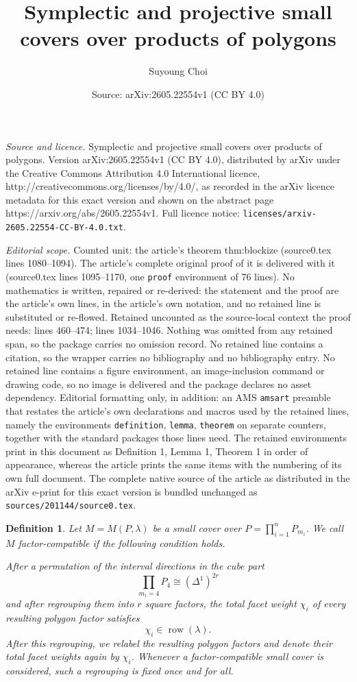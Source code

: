 \documentclass[10pt,a4paper]{amsart}
\title{Symplectic and projective small covers over products of polygons}
\author{Suyoung Choi}
\date{Source: arXiv:2605.22554v1 (CC BY 4.0)}
\newtheorem{definition}{Definition}
\DeclareMathOperator{\row}{row}
\begin{document}
\maketitle

\noindent\emph{Source and licence.} Symplectic and projective small covers over products of polygons. Version arXiv:2605.22554v1 (CC BY 4.0), distributed by arXiv under the Creative Commons Attribution 4.0 International licence, http://creativecommons.org/licenses/by/4.0/, as recorded in the arXiv licence metadata for this exact version and shown on the abstract page https://arxiv.org/abs/2605.22554v1. Full licence notice: \texttt{licenses/arxiv-2605.22554-CC-BY-4.0.txt}.\par\smallskip

\noindent\textit{Editorial scope.} Counted unit: the article's theorem thm:blockize (source0.tex lines 1080--1094). The article's complete original proof of it is delivered with it (source0.tex lines 1095--1170, one \texttt{proof} environment of 76 lines). No mathematics is written, repaired or re-derived: the statement and the proof are the article's own lines, in the article's own notation, and no retained line is substituted or re-flowed.  Retained uncounted as the source-local context the proof needs: lines 460--474; lines 1034--1046.  Nothing was omitted from any retained span, so the package carries no omission record.  No retained line contains a citation, so the wrapper carries no bibliography and no bibliography entry.  No retained line contains a figure environment, an image-inclusion command or drawing code, so no image is delivered and the package declares no asset dependency.  Editorial formatting only, in addition: an AMS \texttt{amsart} preamble that restates the article's own declarations and macros used by the retained lines, namely the environments \texttt{definition}, \texttt{lemma}, \texttt{theorem} on separate counters, together with the standard packages those lines need.  The retained environments print in this document as Definition 1, Lemma 1, Theorem 1 in order of appearance, whereas the article prints the same items with the numbering of its own full document.  The complete native source of the article as distributed in the arXiv e-print for this exact version is bundled unchanged as \texttt{sources/201144/source0.tex}.
\begin{definition}\label{def:factor-compatible}
Let $M=M(P,\lambda)$ be a small cover over $P=\prod_{i=1}^n P_{m_i}$. 
We call $M$ \emph{factor-compatible} if the following condition holds.

After a permutation of the interval directions in the cube part
$$
    \prod_{m_i=4} P_4 \cong (\Delta^1)^{2r}
$$
and after regrouping them into $r$ square factors, the total facet weight $\chi_i$ of every resulting polygon factor satisfies
$$
    \chi_i\in\row(\lambda).
$$
After this regrouping, we relabel the resulting polygon factors and denote their total facet weights again by $\chi_i$.
Whenever a factor-compatible small cover is considered, such a regrouping is fixed once and for all.
\end{definition}
\end{document}
